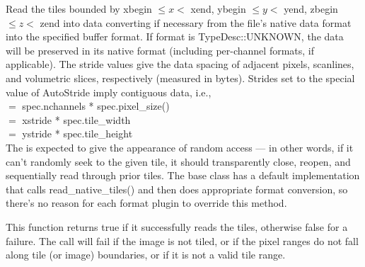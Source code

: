 Read the tiles bounded by {\kw xbegin} $\le x <$ {\kw xend},
{\kw ybegin} $\le y <$ {\kw yend}, {\kw zbegin} $\le z <$ {\kw zend}
into {\kw data}
converting if necessary from the file's native data format into
the specified buffer {\kw format}.
If {\cf format} is {\cf TypeDesc::UNKNOWN}, the data will be preserved 
in its native format (including per-channel formats, if applicable).
The stride values
give the data spacing of adjacent pixels, scanlines, and volumetric
slices, respectively (measured in bytes).  Strides set to the special
value of {\kw AutoStride} imply contiguous data, i.e., \\
 $=$ {\kw spec.nchannels * spec.pixel_size()} \\
 $=$ {\kw xstride * spec.tile_width} \\
 $=$ {\kw ystride * spec.tile_height} \\
The \ImageInput is expected to give the appearance of random access
--- in other words, if it can't randomly seek to the given tile, it
should transparently close, reopen, and sequentially read through prior
tiles.  The base \ImageInput class has a default implementation
that calls {\cf read_native_tiles()} and then does appropriate format conversion,
so there's no reason for each format plugin to override this method.

This function returns {\cf true} if it successfully reads the tiles,
otherwise {\cf false} for a failure.
The call will fail if the image is not tiled, or if the pixel ranges
do not fall along tile (or image) boundaries, or if it is not a valid
tile range.

